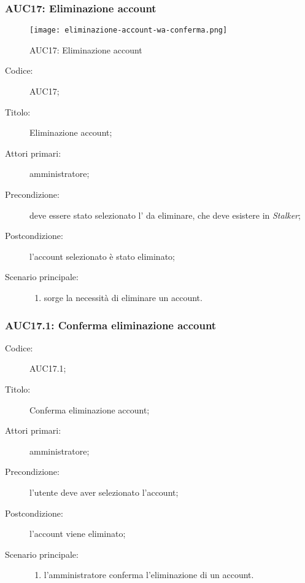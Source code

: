 \documentclass[../../../analisi-dei-requisiti.tex]{subfiles}
\begin{document}
\subsubsection{AUC17: Eliminazione account}%
\label{subs:AUC17}

\begin{figure}[H]
  \centering
  \texttt{[image: eliminazione-account-wa-conferma.png]}
  \caption{AUC17: Eliminazione account}%
  \label{fig:AUC17}
\end{figure}

\begin{description}
  \item[Codice:] AUC17;
  \item[Titolo:] Eliminazione account;
  \item[Attori primari:] amministratore;
  \item[Precondizione:] deve essere stato selezionato l' da eliminare, che deve esistere in \emph{Stalker};
  \item[Postcondizione:] l'account selezionato è stato eliminato;
  \item[Scenario principale:]
  \begin{enumerate}
    \item sorge la necessità di eliminare un account.
  \end{enumerate}
\end{description}

\subsubsection{AUC17.1: Conferma eliminazione account}%
\label{subs:AUC17.1}
\begin{description}
  \item[Codice:] AUC17.1;
  \item[Titolo:] Conferma eliminazione account;
  \item[Attori primari:] amministratore;
  \item[Precondizione:] l'utente deve aver selezionato l'account;
  \item[Postcondizione:] l'account viene eliminato;
  \item[Scenario principale:]
  \begin{enumerate}
    \item l'amministratore conferma l'eliminazione di un account.
  \end{enumerate}
\end{description}
\end{document}

